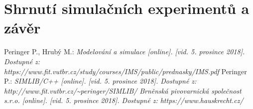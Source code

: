 \documentclass[11pt,a4paper]{article}
\begin{document}
   
\section{Shrnutí simulačních experimentů a závěr}

   
\newpage
\begin{thebibliography}{Per00}
	 Peringer P., Hrubý M.:
    \emph{Modelování a simulace [online]. [vid. 5. prosince 2018]. Dostupné z: https://www.fit.vutbr.cz/study/courses/IMS/public/prednasky/IMS.pdf }
	 Peringer P.:
    \emph{SIMLIB/C++ [online]. [vid. 5. prosince 2018]. Dostupné z: http://www.fit.vutbr.cz/\~{}peringer/SIMLIB/ }
	 \emph{Brněnská pivovarnická společnost s.r.o. [online]. [vid. 5. prosince 2018]. Dostupné z: https://www.hauskrecht.cz/ }
\end{thebibliography}
	
\end{document}

